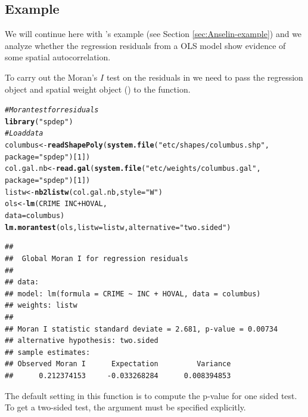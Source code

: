 \documentclass[english,12pt]{book}\usepackage[]{graphicx}\usepackage[]{xcolor}
\makeatletter
\newcommand{\hlnum}[1]{\textcolor[rgb]{0.686,0.059,0.569}{#1}}%
\newcommand{\hlstr}[1]{\textcolor[rgb]{0.192,0.494,0.8}{#1}}%
\newcommand{\hlcom}[1]{\textcolor[rgb]{0.678,0.584,0.686}{\textit{#1}}}%
\newcommand{\hlopt}[1]{\textcolor[rgb]{0,0,0}{#1}}%
\newcommand{\hlstd}[1]{\textcolor[rgb]{0.345,0.345,0.345}{#1}}%
\newcommand{\hlkwb}[1]{\textcolor[rgb]{0.69,0.353,0.396}{#1}}%
\newcommand{\hlkwc}[1]{\textcolor[rgb]{0.333,0.667,0.333}{#1}}%
\newcommand{\hlkwd}[1]{\textcolor[rgb]{0.737,0.353,0.396}{\textbf{#1}}}%
\newenvironment{kframe}{%
 \def\at@end@of@kframe{}%
 \ifinner\ifhmode%
  \def\at@end@of@kframe{\end{minipage}}%
  \begin{minipage}{\columnwidth}%
 \fi\fi%
 \def\FrameCommand##1{\hskip\@totalleftmargin \hskip-\fboxsep
 \colorbox{shadecolor}{##1}\hskip-\fboxsep
     \hskip-\linewidth \hskip-\@totalleftmargin \hskip\columnwidth}%
 \MakeFramed {\advance\hsize-\width
   \@totalleftmargin\z@ \linewidth\hsize
   \@setminipage}}%
 {\par\unskip\endMakeFramed%
 \at@end@of@kframe}
\newenvironment{knitrout}{}{} %
\makeatother
\begin{document}
\subsection{Example}

We will continue here with \cite{anselin1988spatial}'s example (see Section \ref{sec:Anselin-example}) and we analyze whether the regression residuals from a OLS model show evidence of some spatial autocorrelation. 

To carry out the Moran's $I$ test on the residuals in  we need to pass the regression object and spatial weight object () to the  function. 

\begin{knitrout}
\color{fgcolor}\begin{kframe}
\begin{alltt}
\hlcom{# Moran test for residuals}
\hlkwd{library}\hlstd{(}\hlstr{"spdep"}\hlstd{)}
\hlcom{# Load data}
\hlstd{columbus}   \hlkwb{<-} \hlkwd{readShapePoly}\hlstd{(}\hlkwd{system.file}\hlstd{(}\hlstr{"etc/shapes/columbus.shp"}\hlstd{,}
                                      \hlkwc{package} \hlstd{=} \hlstr{"spdep"}\hlstd{)[}\hlnum{1}\hlstd{])}
\hlstd{col.gal.nb} \hlkwb{<-} \hlkwd{read.gal}\hlstd{(}\hlkwd{system.file}\hlstd{(}\hlstr{"etc/weights/columbus.gal"}\hlstd{,}
                                   \hlkwc{package} \hlstd{=} \hlstr{"spdep"}\hlstd{)[}\hlnum{1}\hlstd{])}
\hlstd{listw} \hlkwb{<-} \hlkwd{nb2listw}\hlstd{(col.gal.nb,} \hlkwc{style} \hlstd{=} \hlstr{"W"}\hlstd{)}
\hlstd{ols} \hlkwb{<-} \hlkwd{lm}\hlstd{(CRIME} \hlopt{~} \hlstd{INC} \hlopt{+} \hlstd{HOVAL,}
          \hlkwc{data} \hlstd{=  columbus)}
\hlkwd{lm.morantest}\hlstd{(ols,} \hlkwc{listw} \hlstd{= listw,} \hlkwc{alternative} \hlstd{=} \hlstr{"two.sided"}\hlstd{)}
\end{alltt}
\begin{verbatim}
## 
## 	Global Moran I for regression residuals
## 
## data:  
## model: lm(formula = CRIME ~ INC + HOVAL, data = columbus)
## weights: listw
## 
## Moran I statistic standard deviate = 2.681, p-value = 0.00734
## alternative hypothesis: two.sided
## sample estimates:
## Observed Moran I      Expectation         Variance 
##      0.212374153     -0.033268284      0.008394853
\end{verbatim}
\end{kframe}
\end{knitrout}

The default setting in this function is to compute the p-value for one sided test. To get a two-sided test, the  argument must be specified explicitly. 
\end{document}
